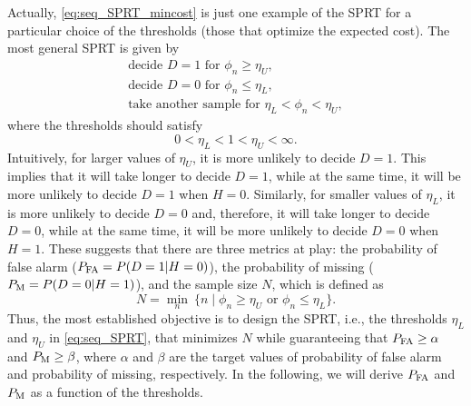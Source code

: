 Actually, \eqref{eq:seq_SPRT_mincost} is just one example of the SPRT for a particular choice of the thresholds (those that optimize the expected cost). The most general SPRT is given by
\begin{equation}
	\label{eq:seq_SPRT}
	\begin{array}{l}
		\text{decide } D = 1 \text{ for } \phi_n \geq \eta_U, \\
		\text{decide } D = 0 \text{ for } \phi_n \leq  \eta_L, \\
		\text{take another sample for } \eta_L < \phi_n < \eta_U,
	\end{array}
\end{equation}
where the thresholds should satisfy
\begin{equation*}
	0 < \eta_L < 1 < \eta_U < \infty.
\end{equation*}
Intuitively, for larger values of $\eta_U$, it is more unlikely to decide $D = 1$. This implies that it will take longer to decide $D = 1$, while at the same time, it will be more unlikely to decide $D = 1$ when $H = 0$. Similarly, for smaller values of $\eta_L$, it is more unlikely to decide $D = 0$ and, therefore, it will take longer to decide $D = 0$, while at the same time, it will be more unlikely to decide $D = 0$ when $H = 1$. These suggests that there are three metrics at play: the probability of false alarm ($P_{\text{FA}} = P(D = 1 | H = 0)$), the probability of missing ($P_{\text{M}} = P(D = 0 | H = 1)$), and the sample size $N$, which is defined as
\begin{equation*}
	\label{eq:sample_size}
	N =  \min_{n} \ \{n \mid \phi_n \geq \eta_U \text{ or } \phi_n \leq \eta_L\}. 
\end{equation*}
Thus,  the most established objective is to design the SPRT, i.e., the thresholds $\eta_L$ and $\eta_U$ in \eqref{eq:seq_SPRT}, that minimizes $N$ while guaranteeing that $P_{\text{FA}} \geq \alpha$ and $P_{\text{M}} \geq \beta$, where $\alpha$ and $\beta$ are the target values of probability of false alarm and probability of missing, respectively. In the following, we will derive $P_{\text{FA}}$ and $P_{\text{M}}$ as a function of the thresholds.

